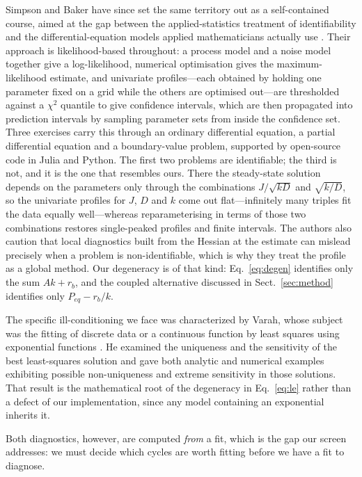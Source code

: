 \documentclass[runningheads]{llncs}
\newcommand{\rb}{\ensuremath{r_{b}}}
\begin{document}
Simpson and Baker have since set the same territory out as a
self-contained course, aimed at the gap between the applied-statistics
treatment of identifiability and the differential-equation models
applied mathematicians actually
use \cite{simpson2026parameter}. Their approach is likelihood-based
throughout: a process model and a noise model together give a
log-likelihood, numerical optimisation gives the maximum-likelihood
estimate, and univariate profiles---each obtained by holding one
parameter fixed on a grid while the others are optimised out---are
thresholded against a $\chi^{2}$ quantile to give confidence
intervals, which are then propagated into prediction intervals by
sampling parameter sets from inside the confidence set. Three
exercises carry this through an ordinary differential equation, a
partial differential equation and a boundary-value problem, supported
by open-source code in Julia and Python. The first two problems are
identifiable; the third is not, and it is the one that resembles ours.
There the steady-state solution depends on the parameters only through
the combinations $J/\sqrt{kD}$ and $\sqrt{k/D}$, so the univariate
profiles for $J$, $D$ and $k$ come out flat---infinitely many triples
fit the data equally well---whereas reparameterising in terms of those
two combinations restores single-peaked profiles and finite intervals.
The authors also caution that local diagnostics built from the Hessian
at the estimate can mislead precisely when a problem is
non-identifiable, which is why they treat the profile as a global
method. Our degeneracy is of that kind:
Eq.~\eqref{eq:degen} identifies only the sum $Ak+\rb$, and the coupled
alternative discussed in Sect.~\ref{sec:method} identifies only
$P_{eq}-\rb/k$.

The specific ill-conditioning we face was characterized by Varah, whose
subject was the fitting of discrete data or a continuous function by
least squares using exponential functions \cite{varah1985fitting}. He
examined the uniqueness and the sensitivity of the best least-squares
solution and gave both analytic and numerical examples exhibiting
possible non-uniqueness and extreme sensitivity in those solutions.
That result is the mathematical root of the degeneracy in
Eq.~\eqref{eq:le} rather than a defect of our implementation, since any
model containing an exponential inherits it.

Both diagnostics, however, are computed \emph{from} a fit, which is the
gap our screen addresses: we must decide which cycles are worth fitting
before we have a fit to diagnose.
\end{document}
